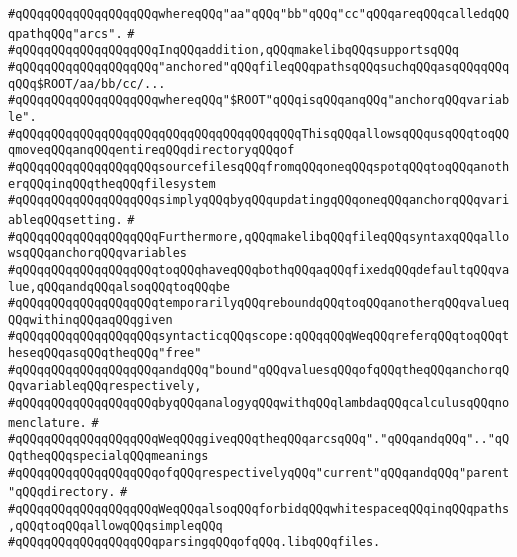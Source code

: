 \verb|#qQQqqQQqqQQqqQQqqQQqwhereqQQq"aa"qQQq"bb"qQQq"cc"qQQqareqQQqcalledqQQqpathqQQq"arcs".|\newline
\verb|#|\newline
\verb|#qQQqqQQqqQQqqQQqqQQqInqQQqaddition,qQQqmakelibqQQqsupportsqQQq|\newline
\verb|#qQQqqQQqqQQqqQQqqQQq"anchored"qQQqfileqQQqpathsqQQqsuchqQQqasqQQqqQQqqQQq$ROOT/aa/bb/cc/...|\newline
\verb|#qQQqqQQqqQQqqQQqqQQqwhereqQQq"$ROOT"qQQqisqQQqanqQQq"anchorqQQqvariable".|\newline
\verb|#qQQqqQQqqQQqqQQqqQQqqQQqqQQqqQQqqQQqqQQqThisqQQqallowsqQQqusqQQqtoqQQqmoveqQQqanqQQqentireqQQqdirectoryqQQqof|\newline
\verb|#qQQqqQQqqQQqqQQqqQQqsourcefilesqQQqfromqQQqoneqQQqspotqQQqtoqQQqanotherqQQqinqQQqtheqQQqfilesystem|\newline
\verb|#qQQqqQQqqQQqqQQqqQQqsimplyqQQqbyqQQqupdatingqQQqoneqQQqanchorqQQqvariableqQQqsetting.|\newline
\verb|#|\newline
\verb|#qQQqqQQqqQQqqQQqqQQqFurthermore,qQQqmakelibqQQqfileqQQqsyntaxqQQqallowsqQQqanchorqQQqvariables|\newline
\verb|#qQQqqQQqqQQqqQQqqQQqtoqQQqhaveqQQqbothqQQqaqQQqfixedqQQqdefaultqQQqvalue,qQQqandqQQqalsoqQQqtoqQQqbe|\newline
\verb|#qQQqqQQqqQQqqQQqqQQqtemporarilyqQQqreboundqQQqtoqQQqanotherqQQqvalueqQQqwithinqQQqaqQQqgiven|\newline
\verb|#qQQqqQQqqQQqqQQqqQQqsyntacticqQQqscope:qQQqqQQqWeqQQqreferqQQqtoqQQqtheseqQQqasqQQqtheqQQq"free"|\newline
\verb|#qQQqqQQqqQQqqQQqqQQqandqQQq"bound"qQQqvaluesqQQqofqQQqtheqQQqanchorqQQqvariableqQQqrespectively,|\newline
\verb|#qQQqqQQqqQQqqQQqqQQqbyqQQqanalogyqQQqwithqQQqlambdaqQQqcalculusqQQqnomenclature.|\newline
\verb|#|\newline
\verb|#qQQqqQQqqQQqqQQqqQQqWeqQQqgiveqQQqtheqQQqarcsqQQq"."qQQqandqQQq".."qQQqtheqQQqspecialqQQqmeanings|\newline
\verb|#qQQqqQQqqQQqqQQqqQQqofqQQqrespectivelyqQQq"current"qQQqandqQQq"parent"qQQqdirectory.|\newline
\verb|#|\newline
\verb|#qQQqqQQqqQQqqQQqqQQqWeqQQqalsoqQQqforbidqQQqwhitespaceqQQqinqQQqpaths,qQQqtoqQQqallowqQQqsimpleqQQq|\newline
\verb|#qQQqqQQqqQQqqQQqqQQqparsingqQQqofqQQq.libqQQqfiles.|\newline
